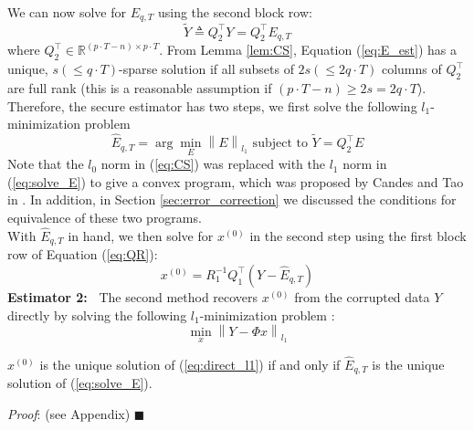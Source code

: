\documentclass[../../thesis.tex]{subfiles}
\newcommand{\norm}[1]{\left\lVert#1\right\rVert}
\begin{document}
We can now solve for $E_{q,T}$ using the second block row:
\begin{equation}
	\tilde Y \triangleq Q_2^\top Y = Q_2^\top E_{q,T}
	\label{eq:E_est}
\end{equation}
where $Q_2^\top \in \mathbb {R} ^{ (p\cdot T-n) \times p\cdot T}$. From Lemma \ref{lem:CS}, Equation (\ref{eq:E_est}) has a unique, $s(\le q\cdot T)$-sparse solution if all subsets of $2s(\le2 q\cdot T)$ columns of $Q_2^\top$ are full rank (this is a reasonable assumption if $ (p\cdot T-n) \ge 2s = 2q\cdot T$). 
Therefore, the secure estimator has two steps, we first solve the following $l_1$-minimization problem
\begin{equation}
	\hat E_{q,T} = \arg \min_E \norm { E}_{l_1} \text{ subject to } \tilde Y = Q_2^\top E 
	\label{eq:solve_E}
\end{equation}
Note that the $l_0$ norm in (\ref{eq:CS}) was replaced with the $l_1$ norm in (\ref{eq:solve_E}) to give a convex program, which was proposed by Candes and Tao in \cite{tao11}. In addition, in Section \ref{sec:error_correction} we discussed the conditions for equivalence of these two programs.\\
With $\hat E_{q,T}$ in hand, we then solve for $x^{(0)}$ in the second step using the first block row of Equation (\ref{eq:QR}):
\begin{equation}
	x^{(0)} = R_1^{-1} Q_1^\top (Y- \hat E_{q,T})
	\label{eq:QR1}
\end{equation}
{\bf Estimator 2:~} 
The second method recovers $x^{(0)}$ from the corrupted data $Y$ directly by %
solving the following $l_1$-minimization problem \cite{tao11}:
\begin{equation}
	\min_x \norm { Y  - \Phi x}_{l_1}
	\label{eq:direct_l1}
\end{equation}

\begin{lem} \label{lem:equivalent}
 $x^{(0)}$ is the unique solution of (\ref{eq:direct_l1}) if and only if ${\hat E}_{q,T}$ is the unique solution of (\ref{eq:solve_E}).
\end{lem}

\textit{Proof}: (see Appendix) \hfill$\blacksquare$
\end{document}
